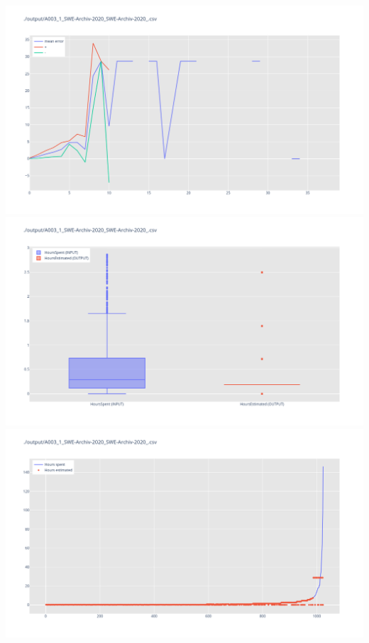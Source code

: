 \includegraphics[width=\textwidth]{Scripts/output/A003_1_SWE-Archiv-2020_SWE-Archiv-2020_.csv.error_distribution.png}
\includegraphics[width=\textwidth]{Scripts/output/A003_1_SWE-Archiv-2020_SWE-Archiv-2020_.csv.png}
\includegraphics[width=\textwidth]{Scripts/output/A003_1_SWE-Archiv-2020_SWE-Archiv-2020_.csv.scatter.png}

